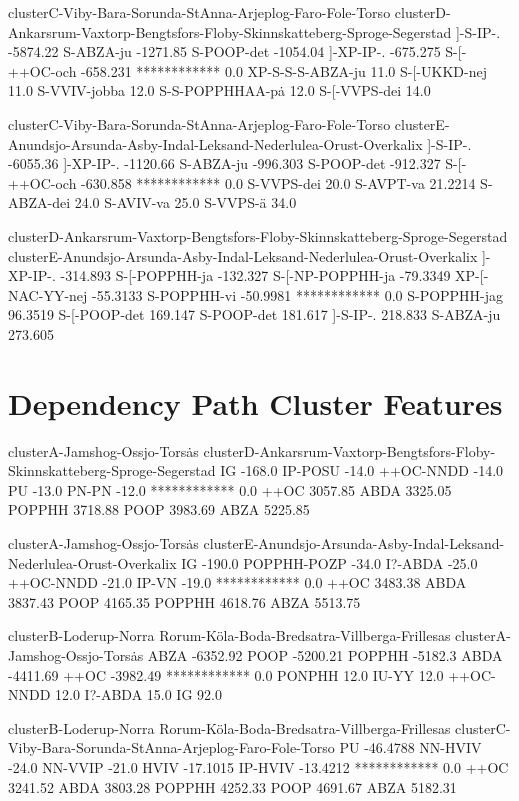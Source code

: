 clusterC-Viby-Bara-Sorunda-StAnna-Arjeplog-Faro-Fole-Torso
clusterD-Ankarsrum-Vaxtorp-Bengtsfors-Floby-Skinnskatteberg-Sproge-Segerstad
]-S-IP-. -5874.22
S-ABZA-ju -1271.85
S-POOP-det -1054.04
]-XP-IP-. -675.275
S-[-++OC-och -658.231
************ 0.0
XP-S-S-S-ABZA-ju 11.0
S-[-UKKD-nej 11.0
S-VVIV-jobba 12.0
S-S-POPPHHAA-p\.a 12.0
S-[-VVPS-dei 14.0

clusterC-Viby-Bara-Sorunda-StAnna-Arjeplog-Faro-Fole-Torso
clusterE-Anundsjo-Arsunda-Asby-Indal-Leksand-Nederlulea-Orust-Overkalix
]-S-IP-. -6055.36
]-XP-IP-. -1120.66
S-ABZA-ju -996.303
S-POOP-det -912.327
S-[-++OC-och -630.858
************ 0.0
S-VVPS-dei 20.0
S-AVPT-va 21.2214
S-ABZA-dei 24.0
S-AVIV-va 25.0
S-VVPS-\"a 34.0

clusterD-Ankarsrum-Vaxtorp-Bengtsfors-Floby-Skinnskatteberg-Sproge-Segerstad
clusterE-Anundsjo-Arsunda-Asby-Indal-Leksand-Nederlulea-Orust-Overkalix
]-XP-IP-. -314.893
S-[-POPPHH-ja -132.327
S-[-NP-POPPHH-ja -79.3349
XP-[-NAC-YY-nej -55.3133
S-POPPHH-vi -50.9981
************ 0.0
S-POPPHH-jag 96.3519
S-[-POOP-det 169.147
S-POOP-det 181.617
]-S-IP-. 218.833
S-ABZA-ju 273.605

\section{Dependency Path Cluster Features}

clusterA-Jamshog-Ossjo-Tors\.as
clusterD-Ankarsrum-Vaxtorp-Bengtsfors-Floby-Skinnskatteberg-Sproge-Segerstad
IG -168.0
IP-POSU -14.0
++OC-NNDD -14.0
PU -13.0
PN-PN -12.0
************ 0.0
++OC 3057.85
ABDA 3325.05
POPPHH 3718.88
POOP 3983.69
ABZA 5225.85

clusterA-Jamshog-Ossjo-Tors\.as
clusterE-Anundsjo-Arsunda-Asby-Indal-Leksand-Nederlulea-Orust-Overkalix
IG -190.0
POPPHH-POZP -34.0
I?-ABDA -25.0
++OC-NNDD -21.0
IP-VN -19.0
************ 0.0
++OC 3483.38
ABDA 3837.43
POOP 4165.35
POPPHH 4618.76
ABZA 5513.75

clusterB-Loderup-Norra Rorum-K\"ola-Boda-Bredsatra-Villberga-Frillesas
clusterA-Jamshog-Ossjo-Tors\.as
ABZA -6352.92
POOP -5200.21
POPPHH -5182.3
ABDA -4411.69
++OC -3982.49
************ 0.0
PONPHH 12.0
IU-YY 12.0
++OC-NNDD 12.0
I?-ABDA 15.0
IG 92.0

clusterB-Loderup-Norra Rorum-K\"ola-Boda-Bredsatra-Villberga-Frillesas
clusterC-Viby-Bara-Sorunda-StAnna-Arjeplog-Faro-Fole-Torso
PU -46.4788
NN-HVIV -24.0
NN-VVIP -21.0
HVIV -17.1015
IP-HVIV -13.4212
************ 0.0
++OC 3241.52
ABDA 3803.28
POPPHH 4252.33
POOP 4691.67
ABZA 5182.31

